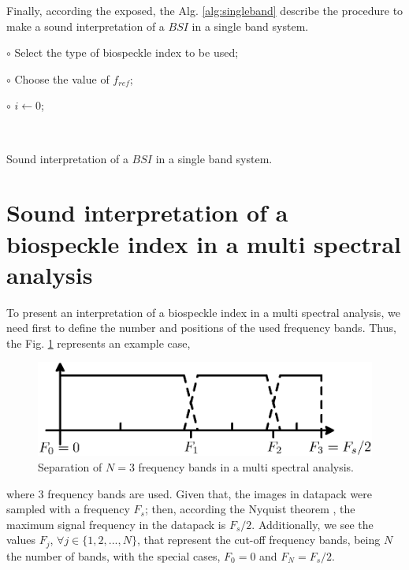 \documentclass[review]{elsarticle}
\begin{document}
Finally, according the exposed, the Alg. \ref{alg:singleband} describe the procedure to make a 
sound interpretation of a $BSI$ in a single band system.


\begin{algorithm}

 $\circ$ Select the type of biospeckle index to be used;
 
 $\circ$ Choose the value of $f_{ref}$;
 
 $\circ$ $i \leftarrow 0$;

 ~\\
 \caption{Sound interpretation of a $BSI$ in a single band system.}
 \label{alg:singleband} 
\end{algorithm}



\section{Sound interpretation of a biospeckle index in a multi spectral analysis}
\label{sec:soundmultifreq}
To present an interpretation of a biospeckle index in a multi spectral analysis,
we need first to define the number and positions of the used frequency bands. Thus, the 
Fig. \ref{fig:Diagrama1a} represents an example case,
\begin{figure}[ht!]
\centering
\includegraphics[width=0.6\columnwidth]{Diagrama1a.eps}
\caption{Separation of $N=3$ frequency bands in a multi spectral analysis.}
\label{fig:Diagrama1a}
\end{figure}
where 3 frequency bands are used. Given that, the images in datapack were sampled
with a frequency $F_s$; then, according the Nyquist theorem \cite{dsp}, 
the maximum signal frequency in the datapack is $F_s/2$. Additionally, we see
the values $F_j$, $\forall j \in \{1,2, ..., N\}$, that represent the cut-off frequency bands,
being $N$ the number of bands, with the special cases, $F_0=0$ and $F_N=F_s/2$.
\end{document}
